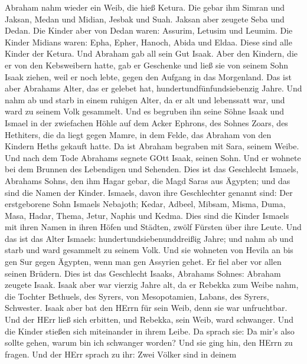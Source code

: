  Abraham nahm wieder ein Weib, die hieß Ketura. 
Die gebar ihm Simran und Jaksan, Medan und Midian, Jesbak und Suah.
 Jaksan aber zeugete Seba und Dedan. Die Kinder aber von
Dedan waren: Assurim, Letusim und Leumim.  Die Kinder
Midians waren: Epha, Epher, Hanoch, Abida und Eldaa. Diese sind alle
Kinder der Ketura.  Und Abraham gab all sein Gut Isaak.
 Aber den Kindern, die er von den Kebsweibern hatte, gab er
Geschenke und ließ sie von seinem Sohn Isaak ziehen, weil er noch lebte,
gegen den Aufgang in das Morgenland.  Das ist aber Abrahams
Alter, das er gelebet hat, hundertundfünfundsiebenzig Jahre.
 Und nahm ab und starb in einem ruhigen Alter, da er alt und
lebenssatt war, und ward zu seinem Volk gesammelt.  Und es
begruben ihn seine Söhne Isaak und Ismael in der zwiefachen Höhle auf
dem Acker Ephrons, des Sohnes Zoars, des Hethiters, die da liegt gegen
Mamre,  in dem Felde, das Abraham von den Kindern Heths
gekauft hatte. Da ist Abraham begraben mit Sara, seinem Weibe.
 Und nach dem Tode Abrahams segnete GOtt Isaak, seinen
Sohn. Und er wohnete bei dem Brunnen des Lebendigen und Sehenden.
 Dies ist das Geschlecht Ismaels, Abrahams Sohns, den ihm
Hagar gebar, die Magd Saras aus Ägypten;  und das sind die
Namen der Kinder. Ismaels, davon ihre Geschlechter genannt sind: Der
erstgeborene Sohn Ismaels Nebajoth; Kedar, Adbeel, Mibsam, 
Misma, Duma, Masa,  Hadar, Thema, Jetur, Naphis und Kedma.
 Dies sind die Kinder Ismaels mit ihren Namen in ihren
Höfen und Städten, zwölf Fürsten über ihre Leute.  Und das
ist das Alter Ismaels: hundertundsiebenunddreißig Jahre; und nahm ab und
starb und ward gesammelt zu seinem Volk.  Und sie wohneten
von Hevila an bis gen Sur gegen Ägypten, wenn man gen Assyrien gehet. Er
fiel aber vor allen seinen Brüdern.  Dies ist das
Geschlecht Isaaks, Abrahams Sohnes: Abraham zeugete Isaak. 
Isaak aber war vierzig Jahre alt, da er Rebekka zum Weibe nahm, die
Tochter Bethuels, des Syrers, von Mesopotamien, Labans, des Syrers,
Schwester.  Isaak aber bat den HErrn für sein Weib, denn
sie war unfruchtbar. Und der HErr ließ sich erbitten, und Rebekka, sein
Weib, ward schwanger.  Und die Kinder stießen sich
miteinander in ihrem Leibe. Da sprach sie: Da mir's also sollte gehen,
warum bin ich schwanger worden? Und sie ging hin, den HErrn zu fragen.
 Und der HErr sprach zu ihr: Zwei Völker sind in deinem
